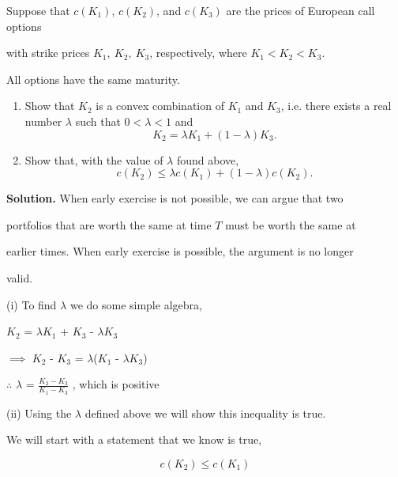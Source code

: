 \documentclass{article}
\begin{document}
Suppose that $c(K_1)$, $c(K_2)$, and $c(K_3)$ are the prices of European call options 

with strike prices $K_1,~K_2,~K_3$, respectively, where $K_1<K_2<K_3$. 

All options have the same maturity.  

\begin{enumerate}

\item[(i)] Show that $K_2$ is a convex combination of $K_1$ and $K_3$, i.e. there exists a real number $\lambda$ such that $0<\lambda<1$ and $$K_2=\lambda K_1+(1-\lambda)K_3.$$



\item[(ii)] Show that, with the value of $\lambda$ found above, $$c(K_2)\leq \lambda c(K_1)+(1-\lambda)c(K_2).$$

\end{enumerate}

\textbf{Solution.} When early exercise is not possible, we can argue that two 

portfolios that are worth the same at time $T$ must be worth the same at 

earlier times. When early exercise is possible, the argument is no longer 

valid.

(i)
To find $\lambda$ we do some simple algebra,

\vspace{\baselineskip}

$K_2$ = $\lambda$$K_1$ + $K_3$ - $\lambda$$K_3$

\vspace{\baselineskip}

$\implies$ $K_2$ - $K_3$ = $\lambda$($K_1$ - $\lambda$$K_3$)

\vspace{\baselineskip}

$\therefore$ $\lambda$ = $\frac{K_2 - K_3}{K_1 - K_3}$ , which is positive 

\vspace{\baselineskip}

(ii)
Using the $\lambda$ defined above we will show this inequality is true.

\vspace{\baselineskip}

We will start with a statement that we know is true,

$$c(K_2) \leq c(K_1)$$ 
\end{document}
